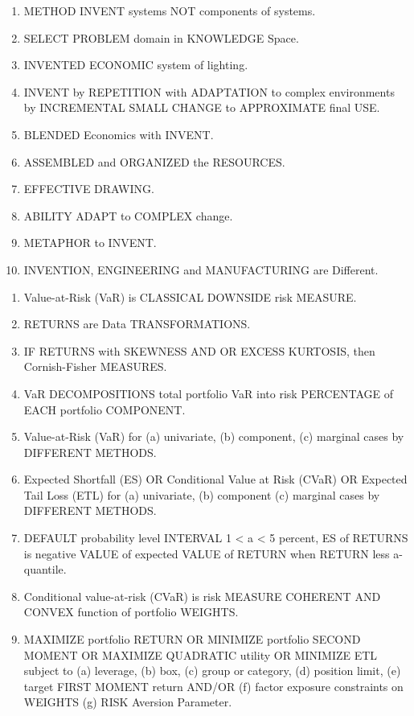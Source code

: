 \begin{enumerate}
	\item METHOD INVENT systems NOT components of systems. \cite{key1000}
	\item SELECT PROBLEM domain in KNOWLEDGE Space.\cite{key1000}
	\item INVENTED ECONOMIC system of lighting. \cite{key1000}
	\item INVENT by REPETITION with ADAPTATION to complex environments by INCREMENTAL SMALL CHANGE to APPROXIMATE final USE.\cite{key1000}
	\item BLENDED Economics with INVENT. \cite{key1000}
	\item ASSEMBLED and ORGANIZED the RESOURCES. \cite{key1000}
	\item EFFECTIVE DRAWING. \cite{key1000}
	\item ABILITY ADAPT to COMPLEX change. \cite{key1000}
	\item METAPHOR to INVENT. \cite{key1000}
	\item INVENTION, ENGINEERING and MANUFACTURING are Different. \cite{key1000}
\end{enumerate}

\begin{enumerate}
	\item Value-at-Risk (VaR) is CLASSICAL DOWNSIDE risk MEASURE.\cite{key100}
	\item RETURNS are Data TRANSFORMATIONS. \cite{key100}
	\item IF RETURNS with SKEWNESS AND OR EXCESS KURTOSIS, then Cornish-Fisher MEASURES. \cite{key100}
	\item VaR DECOMPOSITIONS total portfolio VaR into risk PERCENTAGE of EACH portfolio COMPONENT. \cite{key100}
	\item Value-at-Risk (VaR) for (a) univariate, (b) component, (c) marginal cases by DIFFERENT METHODS. \cite{key100}
	\item Expected Shortfall (ES) OR Conditional Value at Risk (CVaR) OR Expected Tail Loss (ETL) for (a) univariate, (b) component (c) marginal cases by DIFFERENT METHODS. \cite{key100}
	\item DEFAULT probability level INTERVAL 1 < a < 5 percent, ES of RETURNS is negative VALUE of expected VALUE of RETURN when RETURN less a-quantile.  \cite{key100}
	\item Conditional value-at-risk (CVaR) is risk MEASURE COHERENT AND CONVEX function of portfolio WEIGHTS. \cite{key100}
	\item MAXIMIZE portfolio RETURN OR MINIMIZE portfolio SECOND MOMENT OR MAXIMIZE QUADRATIC utility OR MINIMIZE ETL subject to (a) leverage, (b) box, (c) group or category, (d) position limit, (e) target FIRST MOMENT return AND/OR (f) factor exposure constraints on WEIGHTS (g) RISK Aversion Parameter.\cite{key100}
\end{enumerate}

